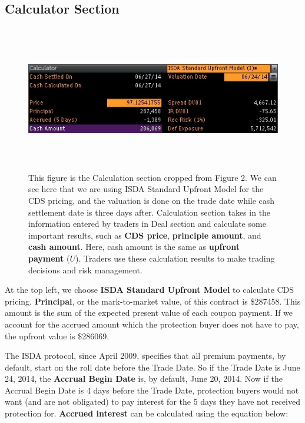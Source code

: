 \documentclass{jss}
\begin{document}
\subsection{Calculator Section}
\label{Calculator section}
\begin{figure}[H]
\centering
\includegraphics[width=5.5in, height=2.5in]{images/AlcoaIncCDSCalculator.jpg}
\caption{
This figure is the Calculation section cropped from Figure 2. We can see here that we are using ISDA Standard Upfront Model for the CDS pricing, and the valuation is done on the trade date while cash settlement date is three days after. Calculation section takes in the information entered by traders in Deal section and calculate some important results,  such as \textbf{CDS price}, \textbf{principle amount}, and \textbf{cash amount}. Here, cash amount is the same as \textbf{upfront payment} ($U$). Traders use these calculation results to make trading decisions and risk management.}
\label{AlcoaIncCDSCalculator}
\end{figure}

At the top left, we choose \textbf{ISDA Standard Upfront Model} to calculate CDS pricing. \textbf{Principal}, or the mark-to-market value, of this contract is \$287458. This amount is the sum of the expected present value of each coupon payment. If we account for the accrued amount which the protection buyer does not have to pay, the upfront value is \$286069. 

The ISDA protocol, since April 2009, specifies that all premium payments, by default, start on the roll date before the Trade Date. So if the Trade Date is June 24, 2014, the \textbf{Accrual Begin Date} is, by default, June 20, 2014. Now if the Accrual Begin Date is 4 days before the Trade Date, protection buyers would not want (and are not obligated) to pay interest for the 5 days they have not received protection for. \textbf{Accrued interest} can be calculated using the equation below:
\end{document}
